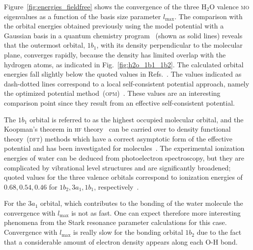 Figure~\ref{fig:energies_fieldfree} shows the convergence of the three
H$_{2}$O valence \textsc{mo} eigenvalues as a function of the basis
size parameter $l_{\mathrm{max}}$. The comparison with the orbital
energies obtained previously using the model potential with a Gaussian
basis in a quantum chemistry program~\cite{illescas_2015} (shown as
solid lines) reveals that the outermost orbital, $1b_{1}$, with its
density perpendicular to the molecular plane, converges rapidly,
because the density has limited overlap with the hydrogen atoms, as
indicated in Fig.~\ref{fig:h2o_1b1_1b2}. The calculated orbital
energies fall slightly below the quoted values in
Refs.~\cite{illescas_2015}. The values indicated as dash-dotted lines
correspond to a local self-consistent potential approach, namely the
optimized potential method~(\textsc{opm})~\cite{opm_2007}. These
values are an interesting comparison point since they result from an
effective self-consistent potential.

The $1b_{1}$ orbital is referred to as the highest occupied molecular
orbital, and the Koopman's theorem in \textsc{hf}
theory~\cite{Koopman_th_2018} can be carried over to density
functional theory~(\textsc{dft}) methods which have a correct
asymptotic form of the effective potential and has been investigated
for molecules~\cite{HF_molecules_2010}. The experimental ionization
energies of water can be deduced from photoelectron spectroscopy, but
they are complicated by vibrational level structures and are
significantly broadened; quoted values for the three valence orbitals
correspond to ionization energies of $0.68, 0.54, 0.46$ for $1b_{2},
3a_{1}, 1b_{1}$,
respectively~\cite{2020Photoelectron}.

For the $3a_{1}$ orbital, which contributes to the bonding of the
water molecule the convergence with $l_{\mathrm{max}}$ is not as
fast. One can expect therefore more interesting phenomena from the
Stark resonance parameter calculations for this case. Convergence with
$l_{\mathrm{max}}$ is really slow for the bonding orbital $1b_{2}$ due
to the fact that a considerable amount of electron density appears
along each O-H bond.


